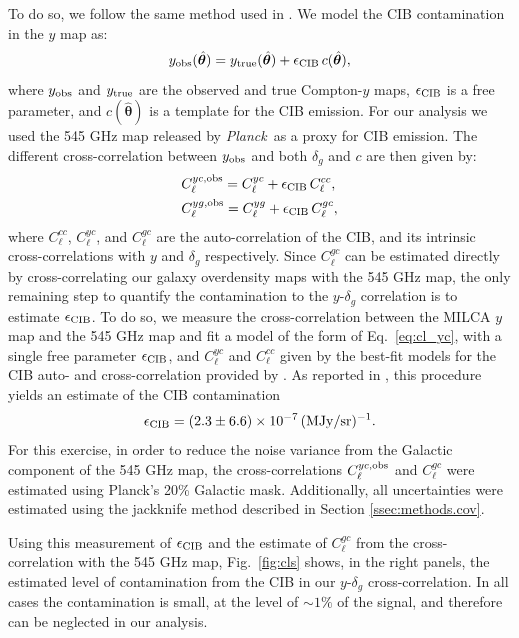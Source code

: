 \documentclass[useAMS,usenatbib]{mn2e}
\newcommand{\nv}{\hat{\boldsymbol{\theta}}}
\def\planck{{\it Planck\/}}
\begin{document}
      To do so, we follow the same method used in \cite{2017MNRAS.467.2315V}. We model the CIB contamination in the $y$ map as:
      \begin{equation}
        y_{\rm obs}(\nv)=y_{\rm true}(\nv)+\epsilon_{\rm CIB}\,c(\nv),
      \end{equation}
      where $y_{\rm obs}$ and $y_{\rm true}$ are the observed and true Compton-$y$ maps, $\epsilon_{\rm CIB}$ is a free parameter, and $c(\nv)$ is a template for the CIB emission. For our analysis we used the 545 GHz map released by \planck\ as a proxy for CIB emission. The different cross-correlation between $y_{\rm obs}$ and both $\delta_g$ and $c$ are then given by:
      \begin{align}\label{eq:cl_yc}
        &C^{yc,{\rm obs}}_\ell= C^{yc}_\ell+\epsilon_{\rm CIB}\,C^{cc}_\ell,\\
        &C^{yg,{\rm obs}}_\ell= C^{yg}_\ell+\epsilon_{\rm CIB}\,C^{gc}_\ell,
      \end{align}
      where $C^{cc}_\ell$, $C^{yc}_\ell$,  and  $C^{gc}_\ell$ are the auto-correlation of the CIB, and its intrinsic cross-correlations with $y$ and $\delta_g$ respectively. Since $C^{gc}_\ell$ can be estimated directly by cross-correlating our galaxy overdensity maps with the 545 GHz map, the only remaining step to quantify the contamination to the $y$-$\delta_g$ correlation is to estimate $\epsilon_{\rm CIB}$. To do so, we measure the cross-correlation between the MILCA $y$ map and the 545 GHz map and fit a model of the form of Eq.\!~\ref{eq:cl_yc}, with a single free parameter $\epsilon_{\rm CIB}$, and $C^{yc}_\ell$ and $C^{cc}_\ell$ given by the best-fit models for the CIB auto- and cross-correlation provided by \cite{2014A&A...571A..30P,2016A&A...594A..23P}. As reported in \cite{2018PhRvD..97f3514A}, this procedure yields an estimate of the CIB contamination
      \begin{equation}
        \epsilon_{\rm CIB}=(2.3\pm6.6)\times10^{-7}\,({\rm MJy}/{\rm sr})^{-1}.
      \end{equation}
      For this exercise, in order to reduce the noise variance from the Galactic component of the 545 GHz map, the cross-correlations $C^{yc,{\rm obs}}_\ell$ and $C^{gc}_\ell$ were estimated using Planck's 20\% Galactic mask. Additionally, all uncertainties were estimated using the jackknife method described in Section \ref{ssec:methods.cov}.
      
      Using this measurement of $\epsilon_{\rm CIB}$ and the estimate of $C^{gc}_\ell$ from the cross-correlation with the 545 GHz map, Fig.\!~\ref{fig:cls} shows, in the right panels, the estimated level of contamination from the CIB in our $y$-$\delta_g$ cross-correlation. In all cases the contamination is small, at the level of $\sim1\%$ of the signal, and therefore can be neglected in our analysis.
\end{document}
